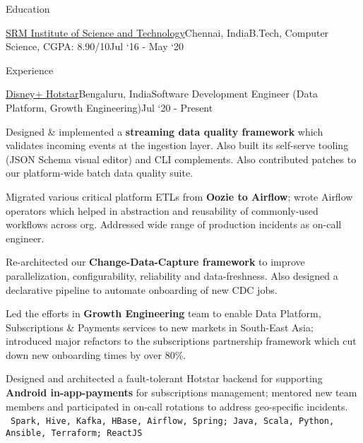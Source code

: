 \documentclass{resume}
\begin{document}
  \begin{rSection}{Education}
    \begin{rEmptySubsection}{\href{https://www.srmist.edu.in/}{SRM Institute of Science and Technology}}{Chennai, India}{B.Tech, Computer Science, CGPA: 8.90/10}{Jul `16 - May `20}
    \end{rEmptySubsection}

  \end{rSection}

  \begin{rSection}{Experience}
  
    \begin{rSubsection}{\href{https://tech.hotstar.com/}{Disney+ Hotstar}}{Bengaluru, India}{Software Development Engineer (Data Platform, Growth Engineering)}{Jul `20 - Present}
      \item Designed \& implemented a \textbf{streaming data quality framework} which validates incoming events at the ingestion layer. Also built its self-serve tooling (JSON Schema visual editor) and CLI complements. Also contributed patches to our platform-wide batch data quality suite.
      \item Migrated various critical platform ETLs from \textbf{Oozie to Airflow}; wrote Airflow operators which helped in abstraction and reusability of commonly-used workflows across org. Addressed wide range of production incidents as on-call engineer.
      \item Re-architected our \textbf{Change-Data-Capture framework} to improve parallelization, configurability, reliability and data-freshness. Also designed a declarative pipeline to automate onboarding of new CDC jobs.
      \item Led the efforts in \textbf{Growth Engineering} team to enable Data Platform, Subscriptions \& Payments services to new markets in South-East Asia; introduced major refactors to the subscriptions partnership framework which cut down new onboarding times by over 80\%.
      \item Designed and architected a fault-tolerant Hotstar backend for supporting \textbf{Android in-app-payments} for subscriptions management; mentored new team members and participated in on-call rotations to address geo-specific incidents.\\
    \textbullet\ \texttt{Spark, Hive, Kafka, HBase, Airflow, Spring; Java, Scala, Python, Ansible, Terraform; ReactJS}
    \end{rSubsection}
    
    \vspace*{-\baselineskip}


\end{rSection}
\end{document}
